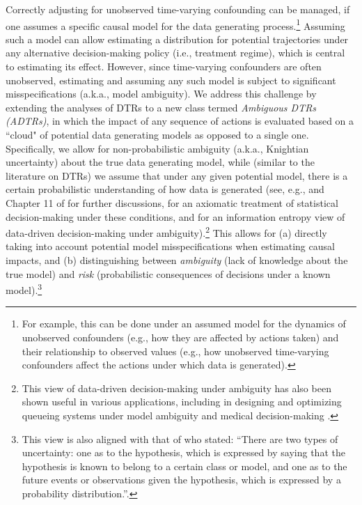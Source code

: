 \documentclass[opre,nonblindrev]{informs2}%
\newcommand{\1}{\hbox{\rm 1\kern-.35em 1}}
\begin{document}
Correctly adjusting for unobserved time-varying confounding can be managed, if one assumes a specific causal model for the data generating process.\footnote{For example, this can be done under an assumed model for the dynamics of unobserved confounders (e.g., how they are affected by actions taken) and their relationship to observed values (e.g., how unobserved time-varying confounders affect the actions under which data is generated).} Assuming such a model can allow  estimating a distribution for potential trajectories under any alternative decision-making policy (i.e., treatment regime), which is central to estimating its effect.  However, since time-varying confounders are often unobserved, estimating and assuming any such model is subject to significant misspecifications (a.k.a., model ambiguity).   We address this challenge by extending the analyses of DTRs to a new class termed {\em Ambiguous DTRs (ADTRs)}, in which the impact of any sequence of actions is evaluated based on a ``cloud" of potential data generating models as opposed to a single one.  Specifically, we allow for  non-probabilistic ambiguity (a.k.a., Knightian uncertainty) about the true data generating model, while (similar to the literature on DTRs) we assume that under any given potential model, there is a certain probabilistic understanding of how data is generated (see, e.g.,  \cite{Saghafian2018} and Chapter 11  of \cite{Manski2007}  for further discussions,  \cite{Stoy2011} for an axiomatic treatment of statistical decision-making under these conditions, and \cite{Saghafian20161} for an information entropy  view of data-driven decision-making under ambiguity).\footnote{This view of data-driven decision-making under ambiguity has also been shown useful in various applications, including in designing and optimizing queueing systems under model ambiguity \citep{BrenSaghafian2019} and medical decision-making \citep{Boloori2020}.}  This allows for (a) directly taking into account potential model misspecifications when estimating causal impacts, and (b) distinguishing between {\em ambiguity} (lack of knowledge about the true model) and {\em risk} (probabilistic consequences of decisions under a known  model).\footnote{This view is also aligned with that of \cite{Arrow1951}  who stated: ``There are
two types of uncertainty: one as to the hypothesis, which is expressed by saying that the hypothesis is known to belong to a certain class or model, and one as to the future events or observations given the hypothesis, which is expressed by a probability distribution.”.}
\end{document}
